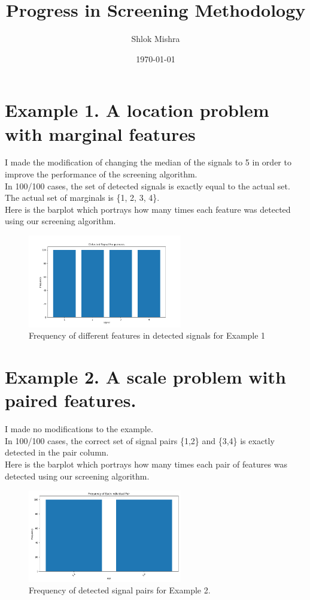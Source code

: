 \documentclass[12pt]{article}
\title{Progress in Screening Methodology}
\author{Shlok Mishra}
\date{\today}
\begin{document}
\maketitle

\section{Example 1. A location problem with marginal features}
I made the modification of changing the median of the signals to 5 in order to improve the performance of the screening algorithm.\\
In 100/100 cases, the set of detected signals is exactly equal to the actual set. The actual set of marginals is \{1, 2, 3, 4\}.\\
Here is the barplot which portrays how many times each feature was detected using our screening algorithm.
\begin{figure}[H]
    \centering
    \includegraphics[width=0.6\textwidth]{eg1.png}
    \caption{Frequency of different features in detected signals for Example 1}
\end{figure}

\section{Example 2. A scale problem with paired features.}
I made no modifications to the example.\\
In 100/100 cases, the correct set of signal pairs \{1,2\} and \{3,4\} is exactly detected in the pair column. \\
Here is the barplot which portrays how many times each pair of features was detected using our screening algorithm.
\begin{figure}[H]
    \centering
    \includegraphics[width=0.6\textwidth]{eg2.png}
    \caption{Frequency of detected signal pairs for Example 2.}
\end{figure}
\end{document}
